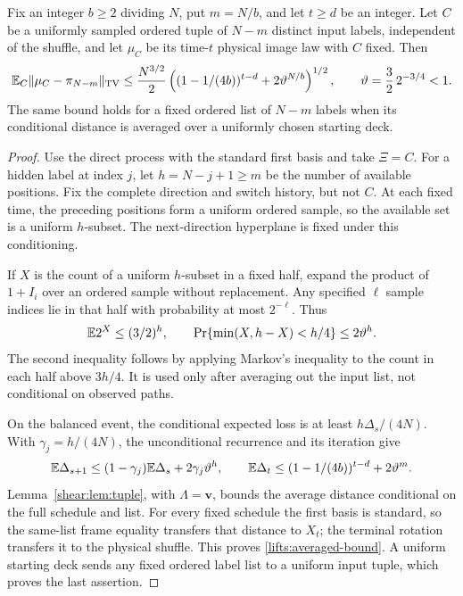 \begin{lemma}
\label{lifts:averaged-tuples}
Fix an integer $b\ge2$ dividing $N$, put $m=N/b$, and let
$t\ge d$ be an integer. Let $C$ be a uniformly sampled ordered
tuple of $N-m$ distinct input labels, independent of the
shuffle, and let $\mu_C$ be its time-$t$ physical image law with
$C$ fixed. Then
\begin{equation}\label{lifts:averaged-bound}
 \mathbb E_C\|\mu_C-\pi_{N-m}\|_{\mathrm{TV}}
 \le\frac{N^{3/2}}2
 \left((1-1/(4b))^{t-d}+2\vartheta^{N/b}\right)^{1/2},
 \qquad \vartheta=\frac32\,2^{-3/4}<1.
\end{equation}
The same bound holds for a fixed ordered list of $N-m$ labels
when its conditional distance is averaged over a uniformly
chosen starting deck.
\end{lemma}
\begin{proof}
Use the direct process with the standard first basis and take
$\Xi=C$. For a hidden label at index $j$, let $h=N-j+1\ge m$ be
the number of available positions. Fix the complete direction
and switch history, but not $C$. At each fixed time, the
preceding positions form a uniform ordered sample, so the
available set is a uniform $h$-subset. The next-direction
hyperplane is fixed under this conditioning.

If $X$ is the count of a uniform $h$-subset in a fixed half,
expand the product of $1+I_i$ over an ordered sample without
replacement. Any specified $\ell$ sample indices lie in that
half with probability at most $2^{-\ell}$. Thus
\begin{equation}\label{shear:eq:uniform-subset-moment}
 \mathbb E2^X\le(3/2)^h,\qquad
 \Pr\{\min(X,h-X)<h/4\}\le2\vartheta^h.
\end{equation}
The second inequality follows by applying Markov's inequality
to the count in each half above $3h/4$. It is used only after
averaging out the input list, not conditional on observed paths.

On the balanced event, the conditional expected loss is at
least $h\Delta_s/(4N)$. With
$\gamma_j=h/(4N)$, the unconditional recurrence and its
iteration give
\[
 \mathbb E\Delta_{s+1}\le(1-\gamma_j)\mathbb E\Delta_s
                   +2\gamma_j\vartheta^h,\qquad
 \mathbb E\Delta_t\le(1-1/(4b))^{t-d}+2\vartheta^m.
\]
Lemma~\ref{shear:lem:tuple}, with $\Lambda=\mathbf v$, bounds
the average distance conditional on the full schedule and list.
For every fixed schedule the first basis is standard, so the
same-list frame equality transfers that distance to $X_t$;
the terminal rotation transfers it to the physical shuffle.
This proves \eqref{lifts:averaged-bound}. A uniform starting
deck sends any fixed ordered label list to a uniform input
tuple, which proves the last assertion.
\end{proof}

